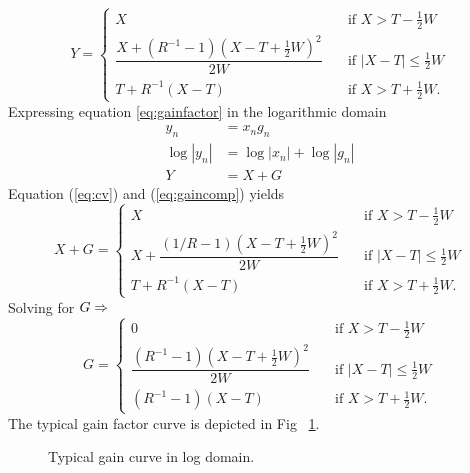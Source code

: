 \documentclass[../main2.tex]{subfiles}
\providecommand{\rootdir}{..}
\begin{document}
\begin{equation} \label{eq:gaincomp}
Y = \begin{cases}
    X & \quad \text{if }X> T-\frac{1}{2}W \\[0.8em]
    \dfrac{X+(R^{-1}-1)(X-T+\frac{1}{2}W)^2}{2W}& \quad \text{if } |X-T| \leq \frac{1}{2}W\\[1.2em]
    T+ R^{-1}(X-T) & \quad \text{if } X > T + \frac{1}{2}W.
\end{cases}
\end{equation}
Expressing equation \eqref{eq:gainfactor} in the logarithmic domain
\begin{align}
y_n &= x_ng_n   \\
\log|y_n| & = \log|x_n| + \log|g_n|   \\
Y &= X + G \label{eq:cv}
\end{align}
Equation (\ref{eq:cv}) and (\ref{eq:gaincomp}) yields
\begin{equation}
X+G = \begin{cases}
    X & \quad \text{if }X > T-\frac{1}{2}W \\[0.8em]
    X + \dfrac{(1/R-1)(X-T+\frac{1}{2}W)^2}{2W}& \quad \text{if } |X-T| \leq \frac{1}{2}W\\[1.2em]
    T+ R^{-1}(X-T) & \quad \text{if } X > T + \frac{1}{2}W.
\end{cases}
\end{equation}
Solving for $G \rm \Rightarrow$
\begin{equation} \label{eq:c}
G = \begin{cases}
    0 & \quad \text{if }X >T -\frac{1}{2}W \\[0.8em]
    \dfrac{(R^{-1}-1)(X-T+\frac{1}{2}W)^2}{2W}& \quad \text{if } |X-T| \leq \frac{1}{2}W\\[1.2em]
    \left(R^{-1}-1\right)\left(X-T\right) & \quad \text{if } X > T + \frac{1}{2}W.
 \end{cases}
\end{equation}
The typical gain factor curve is depicted in Fig ~\ref{fig:typical_gain_detailed}.
\begin{figure}
\centerline{}
\caption{Typical gain curve in log domain.}
\label{fig:typical_gain_detailed}
\end{figure}
\end{document}
